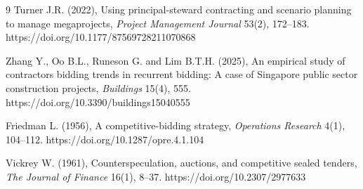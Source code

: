 \documentclass[twoside]{article}
\begin{document}
\begin{thebibliography}{9}
	Turner J.R. (2022), Using principal-steward contracting and scenario planning to manage megaprojects, {\it Project Management Journal} 53(2), 172--183. https://doi.org/10.1177/87569728211070868
	
	Zhang Y., Oo B.L., Runeson G. and Lim B.T.H. (2025), An empirical study of contractors bidding trends in recurrent bidding: A case of Singapore public sector construction projects, {\it Buildings} 15(4), 555. https://doi.org/10.3390/buildings15040555
	
	Friedman L. (1956), A competitive-bidding strategy, {\it Operations Research} 4(1), 104--112. https://doi.org/10.1287/opre.4.1.104
	
	Vickrey W. (1961), Counterspeculation, auctions, and competitive sealed tenders, {\it The Journal of Finance} 16(1), 8--37. https://doi.org/10.2307/2977633
\end{thebibliography}
 
\end{document}
